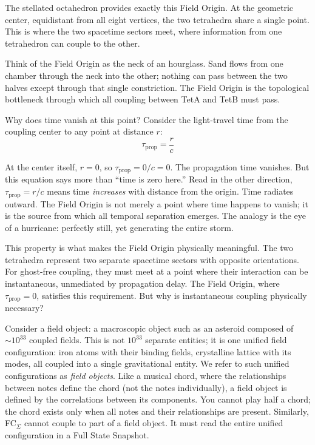 \documentclass[aps,prd,preprint,superscriptaddress,showpacs,preprintnumbers,amsmath,amssymb,nofootinbib]{revtex4-2}
\begin{document}
The stellated octahedron provides exactly this Field Origin. At the geometric center, equidistant from all eight vertices, the two tetrahedra share a single point. This is where the two spacetime sectors meet, where information from one tetrahedron can couple to the other.

Think of the Field Origin as the neck of an hourglass. Sand flows from one chamber through the neck into the other; nothing can pass between the two halves except through that single constriction. The Field Origin is the topological bottleneck through which all coupling between TetA and TetB must pass.

Why does time vanish at this point? Consider the light-travel time from the coupling center to any point at distance $r$:
\begin{equation}
\tau_{\text{prop}} = \frac{r}{c}
\end{equation}

At the center itself, $r = 0$, so $\tau_{\text{prop}} = 0/c = 0$. The propagation time vanishes. But this equation says more than ``time is zero here.'' Read in the other direction, $\tau_{\text{prop}} = r/c$ means time \emph{increases} with distance from the origin. Time radiates outward. The Field Origin is not merely a point where time happens to vanish; it is the source from which all temporal separation emerges. The analogy is the eye of a hurricane: perfectly still, yet generating the entire storm.

This property is what makes the Field Origin physically meaningful. The two tetrahedra represent two separate spacetime sectors with opposite orientations. For ghost-free coupling, they must meet at a point where their interaction can be instantaneous, unmediated by propagation delay. The Field Origin, where $\tau_{\text{prop}} = 0$, satisfies this requirement. But why is instantaneous coupling physically necessary?

Consider a field object: a macroscopic object such as an asteroid composed of $\sim 10^{33}$ coupled fields. This is not $10^{33}$ separate entities; it is one unified field configuration: iron atoms with their binding fields, crystalline lattice with its modes, all coupled into a single gravitational entity. We refer to such unified configurations as \emph{field objects}. Like a musical chord, where the relationships between notes define the chord (not the notes individually), a field object is defined by the correlations between its components. You cannot play half a chord; the chord exists only when all notes and their relationships are present. Similarly, FC$_{\Sigma}$ cannot couple to part of a field object. It must read the entire unified configuration in a Full State Snapshot.
\end{document}
